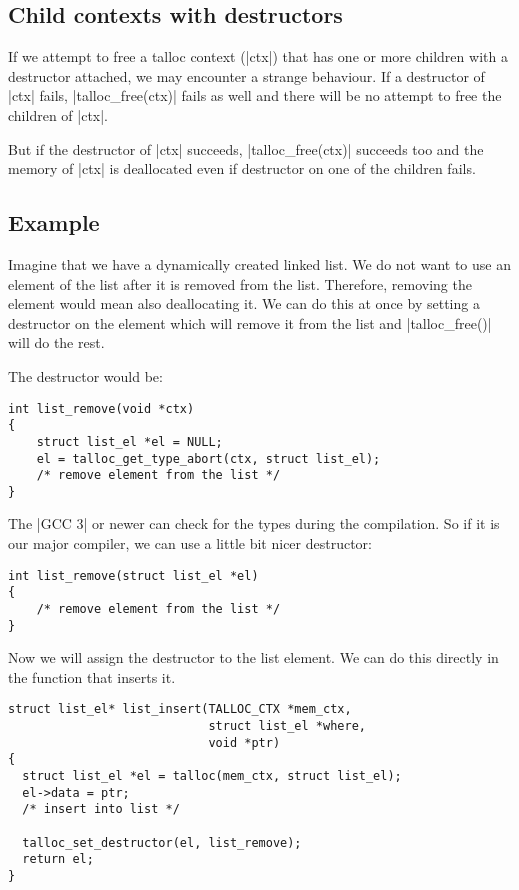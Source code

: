 \subsection{Child contexts with destructors}

If we attempt to free a talloc context (|ctx|) that has one or more children
with a destructor attached, we may encounter a strange behaviour. If a
destructor of |ctx| fails, |talloc_free(ctx)| fails as well and there will
be no attempt to free the children of |ctx|.

But if the destructor of |ctx| succeeds, |talloc_free(ctx)| succeeds too and
the memory of |ctx| is deallocated even if destructor on one of the children
fails.

\subsection{Example}

Imagine that we have a dynamically created linked list. We do not want to use an
element of the list after it is removed from the list. Therefore, removing the
element would mean also deallocating it. We can do this at once by setting a
destructor on the element which will remove it from the list and
|talloc_free()| will do the rest.

The destructor would be:

\begin{lstlisting}[caption={Remove an element from the list -- destructor}]
int list_remove(void *ctx)
{
    struct list_el *el = NULL;
    el = talloc_get_type_abort(ctx, struct list_el);
    /* remove element from the list */    
}
\end{lstlisting}

\noindent
The |GCC 3| or newer can check for the types during the compilation. So if it is
our major compiler, we can use a little bit nicer destructor:

\begin{lstlisting}[caption={Remove an element from the list -- type-safe
destructor}]
int list_remove(struct list_el *el)
{
    /* remove element from the list */    
}
\end{lstlisting}

\noindent
Now we will assign the destructor to the list element. We can do this directly
in the function that inserts it.

\begin{lstlisting}[caption={Remove an element from the list when freed},
morekeywords={talloc_set_destructor}]
struct list_el* list_insert(TALLOC_CTX *mem_ctx,
                            struct list_el *where,
                            void *ptr)
{
  struct list_el *el = talloc(mem_ctx, struct list_el);
  el->data = ptr;
  /* insert into list */
  
  talloc_set_destructor(el, list_remove);
  return el;
}
\end{lstlisting}

